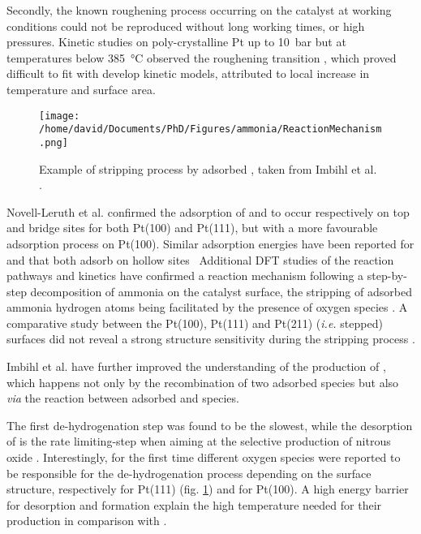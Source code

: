 Secondly, the known roughening process occurring on the catalyst at working conditions could not be reproduced without long working times, or high pressures.
Kinetic studies on poly-crystalline Pt up to \qty{10}{\bar} but at temperatures below \qty{385}{\degreeCelsius} observed the roughening transition \parencite{Kraehnert2008}, which proved difficult to fit with develop kinetic models, attributed to local increase in temperature and surface area.


\begin{figure}[!htb]
    \centering
    \texttt{[image: /home/david/Documents/PhD/Figures/ammonia/ReactionMechanism.png]}
    \caption{
    Example of  stripping process by adsorbed , taken from Imbihl et al. \parencite*{Imbihl2007}.
    }
    \label{fig:ReactionMechanism}
\end{figure}

Novell-Leruth et al. \parencite*{NovellLeruth2005} confirmed the adsorption of  and  to occur respectively on top and bridge sites for both Pt(100) and Pt(111), but with a more favourable adsorption process on Pt(100).
Similar adsorption energies have been reported for  and  that both adsorb on hollow sites \
Additional DFT studies of the reaction pathways and kinetics have confirmed a reaction mechanism following a step-by-step decomposition of ammonia on the catalyst surface, the stripping of adsorbed ammonia hydrogen atoms being facilitated by the presence of oxygen species \parencite{Offermans2006}.
A comparative study between the Pt(100), Pt(111) and Pt(211) (\textit{i.e.} stepped) surfaces did not reveal a strong structure sensitivity during the \ce{NH_3} stripping process \parencite{Offermans2007}.

Imbihl et al. \parencite*{Imbihl2007} have further improved the understanding of the production of , which happens not only by the recombination of two adsorbed  species but also \textit{via} the reaction between adsorbed  and  species.

The first de-hydrogenation step was found to be the slowest, while the desorption of  is the rate limiting-step when aiming at the selective production of nitrous oxide \parencite{NovellLeruth2008}.
Interestingly, for the first time different oxygen species were reported to be responsible for the de-hydrogenation process depending on the surface structure, respectively \ce{O} for Pt(111) (fig. \ref{fig:ReactionMechanism}) and  for Pt(100).
A high energy barrier for \ce{NO} desorption and \ce{N_2O} formation explain the high temperature needed for their production in comparison with \ce{N_2}.

